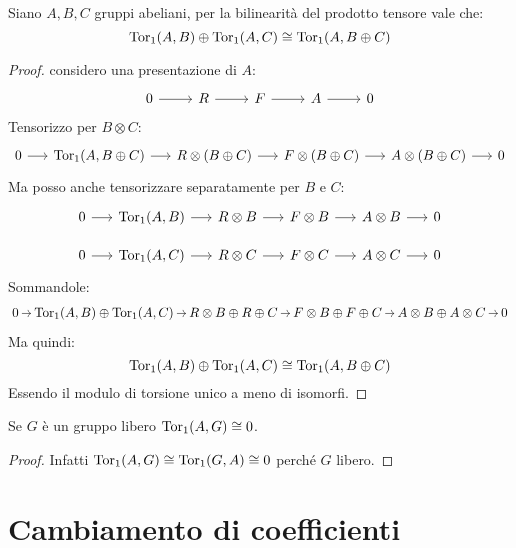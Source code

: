 \begin{lemma}
  Siano $ A, B, C $ gruppi abeliani, per la bilinearità del prodotto tensore
  vale che:
  \[
    \mathrm{Tor_1}( A, B) \oplus \mathrm{Tor_1}( A, C) \cong \mathrm{Tor_1}( A, B \oplus C)
  \]
\end{lemma}
\begin{proof}
  considero una presentazione di $ A $:
  \[
    \begin{tikzcd}
      0 \rar & R \rar & F \rar & A \rar & 0
    \end{tikzcd}
  \]
  Tensorizzo per $ B \otimes C $:
  \[
    \begin{tikzcd}[nodes = {column sep = 15pt}]
      0 \rar & \tor{A, B \oplus C} \rar & R \otimes (B \oplus C) \rar & F \otimes (B \oplus C)\rar & A \otimes (B \oplus C) \rar & 0
    \end{tikzcd}
  \]
  Ma posso anche tensorizzare separatamente per $ B $ e $ C $:
  \[
    \begin{tikzcd}[nodes = {column sep = 15pt, row sep = 10 pt}]
      0 \rar & \tor{A, B } \rar & R \otimes B \rar & F \otimes B \rar & A \otimes B \rar & 0 \\
      0 \rar & \tor{A, C} \rar & R \otimes C \rar & F \otimes C \rar & A \otimes C \rar & 0
    \end{tikzcd}
  \]
  Sommandole:
  \[
    \begin{tikzcd}[nodes = {column sep = 8pt, inner sep = 2pt, outer sep = 0.5pt}]
      0 \rar & \tor{A, B} \oplus \tor{A, C} \rar & R \otimes B \oplus R \oplus C \rar & F \otimes B \oplus F \oplus C \rar & A \otimes B \oplus A \otimes C  \rar & 0
    \end{tikzcd}
  \]
  Ma quindi:
  \[
    \mathrm{Tor_1}( A, B) \oplus \mathrm{Tor_1}( A, C) \cong \mathrm{Tor_1}( A, B \oplus C)
  \]
  Essendo il modulo di torsione unico a meno di isomorfi.
 \end{proof}
 \begin{corollary}
   Se $ G $ è un gruppo libero $ \mathrm{Tor_1}( A, G) \cong 0 $.
\end{corollary}
\begin{proof}
  Infatti $ \mathrm{Tor_1}( A, G) \cong \mathrm{Tor_1}( G, A) \cong 0 $ perché $ G $ libero.
\end{proof}

\section{Cambiamento di coefficienti}

